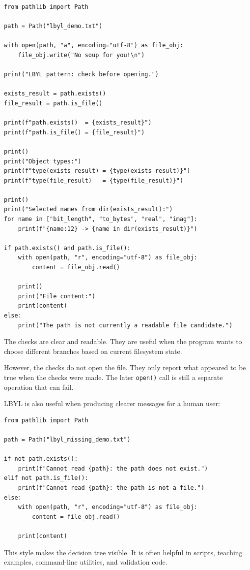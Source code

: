 \begin{verbatim}
from pathlib import Path

path = Path("lbyl_demo.txt")

with open(path, "w", encoding="utf-8") as file_obj:
    file_obj.write("No soup for you!\n")

print("LBYL pattern: check before opening.")

exists_result = path.exists()
file_result = path.is_file()

print(f"path.exists()  = {exists_result}")
print(f"path.is_file() = {file_result}")

print()
print("Object types:")
print(f"type(exists_result) = {type(exists_result)}")
print(f"type(file_result)   = {type(file_result)}")

print()
print("Selected names from dir(exists_result):")
for name in ["bit_length", "to_bytes", "real", "imag"]:
    print(f"{name:12} -> {name in dir(exists_result)}")

if path.exists() and path.is_file():
    with open(path, "r", encoding="utf-8") as file_obj:
        content = file_obj.read()

    print()
    print("File content:")
    print(content)
else:
    print("The path is not currently a readable file candidate.")
\end{verbatim}

The checks are clear and readable. They are useful when the program wants to choose different branches based on current filesystem state.

However, the checks do not open the file. They only report what appeared to be true when the checks were made. The later \texttt{open()} call is still a separate operation that can fail.

LBYL is also useful when producing clearer messages for a human user:

\begin{verbatim}
from pathlib import Path

path = Path("lbyl_missing_demo.txt")

if not path.exists():
    print(f"Cannot read {path}: the path does not exist.")
elif not path.is_file():
    print(f"Cannot read {path}: the path is not a file.")
else:
    with open(path, "r", encoding="utf-8") as file_obj:
        content = file_obj.read()

    print(content)
\end{verbatim}

This style makes the decision tree visible. It is often helpful in scripts, teaching examples, command-line utilities, and validation code.

